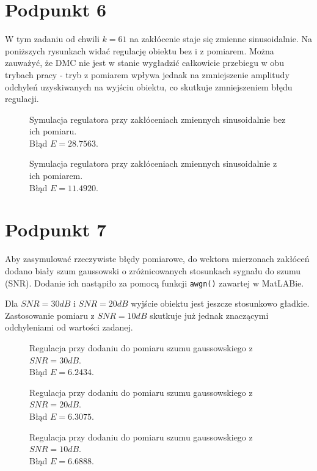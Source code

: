 \chapter{Podpunkt 6}
W tym zadaniu od chwili $ k = \num{61} $ na zakłócenie staje się zmienne sinusoidalnie. Na poniższych rysunkach widać regulację obiektu bez i z pomiarem. Można zauważyć, że DMC nie jest w stanie wygładzić całkowicie przebiegu w obu trybach pracy - tryb z pomiarem wpływa jednak na zmniejszenie amplitudy odchyleń uzyskiwanych na wyjściu obiektu, co skutkuje zmniejszeniem błędu regulacji. 

\begin{figure}[ht]
\centering

\caption{Symulacja regulatora przy zakłóceniach zmiennych sinusoidalnie bez ich pomiaru.\\Błąd $ E = \num{28,7563} $.}
\label{Z6a}
\end{figure}
\begin{figure}[ht]
\centering

\caption{Symulacja regulatora przy zakłóceniach zmiennych sinusoidalnie z ich pomiarem.\\Błąd $ E = \num{11,4920} $.}
\label{Z6b}
\end{figure}

\chapter{Podpunkt 7}
Aby zasymulować rzeczywiste błędy pomiarowe, do wektora mierzonach zakłóceń dodano biały szum gaussowski o zróżnicowanych stosunkach sygnału do szumu (SNR). Dodanie ich nastąpiło za pomocą funkcji \verb|awgn()| zawartej w MatLABie.

Dla $ \mathit{SNR} = 30\mathit{dB} $ i $ \mathit{SNR} = 20\mathit{dB} $ wyjście obiektu jest jeszcze stosunkowo gładkie. Zastosowanie pomiaru z $ \mathit{SNR} = 10\mathit{dB} $ skutkuje już jednak znaczącymi odchyleniami od wartości zadanej.

\begin{figure}[ht]
	\centering
	
	\caption{Regulacja przy dodaniu do pomiaru szumu gaussowskiego z $ \mathit{SNR} = 30\mathit{dB} $.\\Błąd $ E = \num{6,2434}  $.}
	\label{Z7a}
\end{figure}
\begin{figure}[ht]
	\centering
	
	\caption{Regulacja przy dodaniu do pomiaru szumu gaussowskiego z $ \mathit{SNR} = 20\mathit{dB} $.\\Błąd $ E = \num{6,3075} $.}
	\label{Z7b}
\end{figure}
\begin{figure}[ht]
	\centering
	
	\caption{Regulacja przy dodaniu do pomiaru szumu gaussowskiego z $ \mathit{SNR} = 10\mathit{dB} $.\\Błąd $ E = \num{6,6888} $. }
	\label{Z7c}
\end{figure}